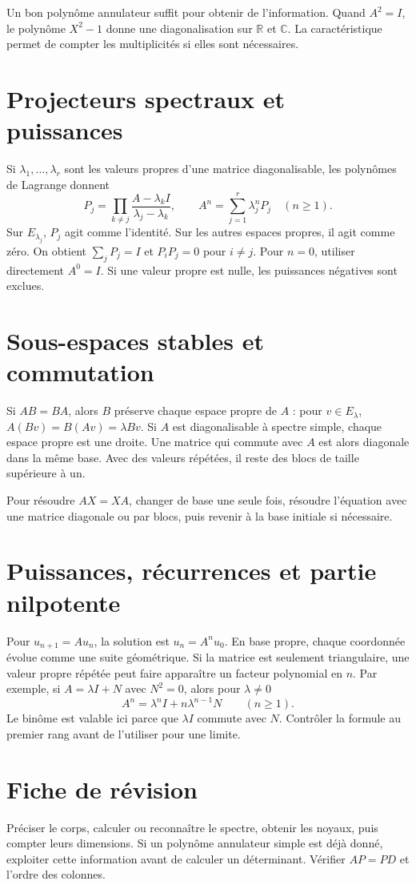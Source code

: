 \documentclass[11pt,a4paper]{article}
\begin{document}
Un bon polynôme annulateur suffit pour obtenir de l’information. Quand $A^2=I$, le polynôme $X^2-1$ donne une diagonalisation sur $\mathbb R$ et $\mathbb C$. La caractéristique permet de compter les multiplicités si elles sont nécessaires.

\section*{Projecteurs spectraux et puissances}
Si $\lambda_1,\ldots,\lambda_r$ sont les valeurs propres d’une matrice diagonalisable, les polynômes de Lagrange donnent
\[ P_j=\prod_{k\ne j}\frac{A-\lambda_k I}{\lambda_j-\lambda_k},\qquad
A^n=\sum_{j=1}^r\lambda_j^nP_j\quad(n\ge1). \]
Sur $E_{\lambda_j}$, $P_j$ agit comme l’identité. Sur les autres espaces propres, il agit comme zéro. On obtient $\sum_jP_j=I$ et $P_iP_j=0$ pour $i\ne j$. Pour $n=0$, utiliser directement $A^0=I$. Si une valeur propre est nulle, les puissances négatives sont exclues.

\section*{Sous-espaces stables et commutation}
Si $AB=BA$, alors $B$ préserve chaque espace propre de $A$ : pour $v\in E_\lambda$, $A(Bv)=B(Av)=\lambda Bv$. Si $A$ est diagonalisable à spectre simple, chaque espace propre est une droite. Une matrice qui commute avec $A$ est alors diagonale dans la même base. Avec des valeurs répétées, il reste des blocs de taille supérieure à un.

Pour résoudre $AX=XA$, changer de base une seule fois, résoudre l’équation avec une matrice diagonale ou par blocs, puis revenir à la base initiale si nécessaire.

\section*{Puissances, récurrences et partie nilpotente}
Pour $u_{n+1}=Au_n$, la solution est $u_n=A^nu_0$. En base propre, chaque coordonnée évolue comme une suite géométrique. Si la matrice est seulement triangulaire, une valeur propre répétée peut faire apparaître un facteur polynomial en $n$. Par exemple, si $A=\lambda I+N$ avec $N^2=0$, alors pour $\lambda\ne0$
\[ A^n=\lambda^n I+n\lambda^{n-1}N\qquad(n\ge1). \]
Le binôme est valable ici parce que $\lambda I$ commute avec $N$. Contrôler la formule au premier rang avant de l’utiliser pour une limite.

\section*{Fiche de révision}
Préciser le corps, calculer ou reconnaître le spectre, obtenir les noyaux, puis compter leurs dimensions. Si un polynôme annulateur simple est déjà donné, exploiter cette information avant de calculer un déterminant. Vérifier $AP=PD$ et l’ordre des colonnes.
\end{document}
